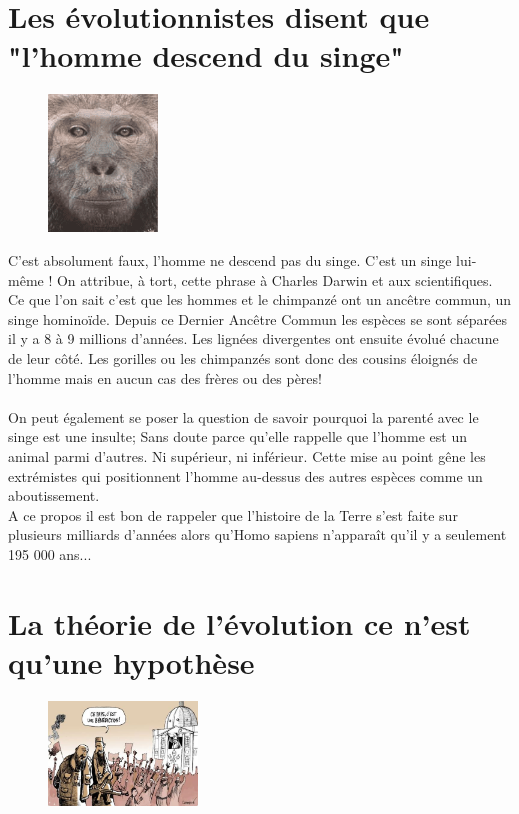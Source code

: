 \section{Les évolutionnistes disent que "l'homme descend du singe"}
\begin{figure}
	\includegraphics[width=110px]{img8.png}
\end{figure}
C'est absolument faux, l'homme ne descend pas du singe. C'est un singe lui-même ! 
On attribue, à tort, cette phrase à Charles Darwin et aux scientifiques. 
Ce que l'on sait c'est que les hommes et le chimpanzé ont un ancêtre commun, un 
singe hominoïde. Depuis ce Dernier Ancêtre Commun les espèces se sont séparées
il y a 8 à 9 millions d'années. Les lignées divergentes ont ensuite évolué 
chacune de leur côté. Les gorilles ou les chimpanzés sont donc des cousins 
éloignés de l'homme mais en aucun cas des frères ou des pères!\\ \\
On peut également se poser la question de savoir pourquoi la parenté avec le 
singe est une insulte; Sans doute parce qu'elle rappelle que l'homme est un 
animal parmi d'autres. Ni supérieur, ni inférieur. Cette mise au point gêne 
les extrémistes qui positionnent l'homme au-dessus des autres espèces comme un 
aboutissement. \\
A ce propos il est bon de rappeler que l'histoire de la Terre s'est faite sur 
plusieurs milliards d'années alors qu'Homo sapiens n'apparaît qu'il y a 
seulement 195 000 ans...

\section{La théorie de l'évolution ce n'est qu'une hypothèse}
\begin{figure}
	\includegraphics[width=150px]{img9.png}
\end{figure}


